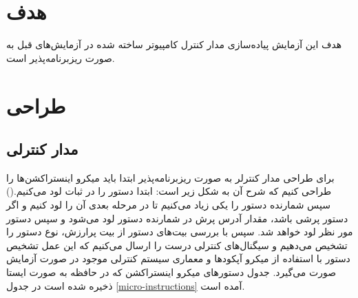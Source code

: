 \documentclass{article}
\begin{document}
\section{هدف}
هدف این آزمایش پیاده‌سازی مدار کنترل کامپیوتر ساخته شده در آزمایش‌های قبل به صورت ریزبرنامه‌پذیر است.

\section{طراحی}
\subsection{مدار کنترلی}
برای طراحی مدار کنترلر به صورت ریزبرنامه‌‌پذیر ابتدا باید میکرو اینستراکشن‌ها را طراحی کنیم که شرح آن به شکل زیر است:
ابتدا دستور را در ثبات لود می‌کنیم.()
سپس شمارنده دستور را یکی زیاد می‌کنیم تا در مرحله بعدی آن را لود کنیم و اگر دستور پرشی باشد، مقدار آدرس پرش در شمارنده دستور لود می‌شود و سپس دستور مور نظر لود خواهد شد.
سپس با بررسی بیت‌های دستور از بیت پر‌ارزش، نوع دستور را تشخیص می‌دهیم و سیگنال‌های کنترلی درست را ارسال می‌کنیم که این عمل تشخیص دستور با استفاده از میکرو آپکود‌ها و معماری سیستم کنترلی موجود در صورت آزمایش صورت می‌گیرد.
جدول دستور‌های میکرو اینستراکشن که در حافظه به صورت ایستا ذخیره شده است در جدول \ref{micro-instructions} آمده است.
\end{document}
